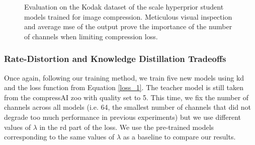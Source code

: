 \documentclass{article}
\begin{document}
\begin{figure}
    \centering
    \qquad
    \caption[Evaluation on the Kodak dataset of the scale hyperprior student models trained for image compression.]{Evaluation on the Kodak dataset of the scale hyperprior student models trained for image compression. Meticulous visual inspection and average \acrshort{mse} of the output prove the importance of the number of channels when limiting compression loss.}
    \label{kd_lic_2}
\end{figure}

\subsubsection{Rate-Distortion and Knowledge Distillation Tradeoffs}
Once again, following our training method, we train five new models using \acrshort{kd} and the loss function from Equation \ref{loss_1}. The teacher model is still taken from the compressAI zoo with \textsf{quality} set to 5. This time, we fix the number of channels across all models (i.e. 64, the smallest number of channels that did not degrade too much performance in previous experiments) but we use different values of \(\lambda\) in the \acrshort{rd} part of the loss. We use the pre-trained models corresponding to the same values of \(\lambda\) as a baseline to compare our results.
\end{document}
